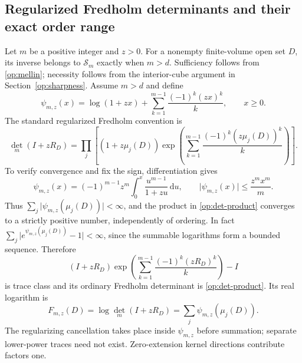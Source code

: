 \documentclass[11pt,reqno]{amsart}
\numberwithin{equation}{section}
\newcommand{\dd}{\,\mathrm d}
\newcommand{\abs}[1]{\lvert#1\rvert}
\begin{document}
\subsection{Regularized Fredholm determinants and their exact order range}
\label{op:determinants}

Let $m$ be a positive integer and $z>0$.  For a nonempty finite-volume
open set $D$, its inverse belongs to $\mathcal S_m$ exactly when
$m>d$.  Sufficiency follows from \eqref{op:mellin}; necessity
follows from the interior-cube argument in
Section~\ref{op:sharpness}.  Assume $m>d$ and define
\begin{equation}\label{op:det-filter}
 \psi_{m,z}(x)=\log(1+zx)
       +\sum_{k=1}^{m-1}\frac{(-1)^k(zx)^k}{k},\qquad x\ge0.
\end{equation}
The standard regularized Fredholm convention
\cite{BritzEtAl2021} is
\begin{equation}\label{op:det-product}
 \det_m(I+zR_D)=\prod_j\left[(1+z\mu_j(D))
     \exp\left(\sum_{k=1}^{m-1}
                   \frac{(-1)^k(z\mu_j(D))^k}{k}\right)\right].
\end{equation}
To verify convergence and fix the sign, differentiation gives
\begin{equation}\label{op:det-remainder}
 \psi_{m,z}(x)=(-1)^{m-1}z^m
       \int_0^x\frac{u^{m-1}}{1+zu}\dd u,
 \qquad
 \abs{\psi_{m,z}(x)}\le\frac{z^m x^m}{m}.
\end{equation}
Thus $\sum_j\abs{\psi_{m,z}(\mu_j(D))}<\infty$, and the
product in \eqref{op:det-product} converges to a strictly positive
number, independently of ordering.  In fact
$\sum_j\abs{e^{\psi_{m,z}(\mu_j(D))}-1}<\infty$, since
the summable logarithms form a bounded sequence.  Therefore
\[
 (I+zR_D)\exp\left(\sum_{k=1}^{m-1}
                     \frac{(-1)^k(zR_D)^k}{k}\right)-I
\]
is trace class and its ordinary Fredholm determinant is
\eqref{op:det-product}.  Its real logarithm is
\begin{equation}\label{op:log-det}
 F_{m,z}(D)=\log\det_m(I+zR_D)
           =\sum_j\psi_{m,z}(\mu_j(D)).
\end{equation}
The regularizing cancellation takes place inside
$\psi_{m,z}$ before summation; separate lower-power traces need
not exist.  Zero-extension kernel directions contribute factors one.
\end{document}
